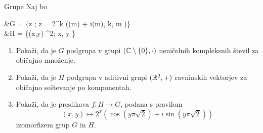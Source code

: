 \begin{frame}{Grupe}
	Naj bo
	\begin{flalign*}
		&G = \{z \in \CC ; z = 2^k (\cos(m\pi{}) + i\sin(m\pi{}), k, m \in \ZZ)\} \\
		&H = \{(x,y) \in \RR^2; x, y \in \ZZ \} 
	\end{flalign*}
	\begin{enumerate}
		\item
			Pokaži, da je $G$ podgrupa v grupi \((\mathbb{C} \setminus \{0\},\cdot)\)
			neničelnih kompleksnih števil za običajno množenje.
		\item
			Pokaži, da je $H$ podgrupa v aditivni grupi \((\mathbb{R}^2, +)\)
			ravninskih vektorjev za običajno seštevanje po komponentah.
		\item
			Pokaži, da je preslikava $f:H\to G$, podana s pravilom
			\[(x, y) \mapsto 2^x (\cos(y\pi\sqrt{2}) + i\sin(y\pi\sqrt{2}))\]
			izomorfizem grup $G$ in $H$.
	\end{enumerate}
\end{frame}
